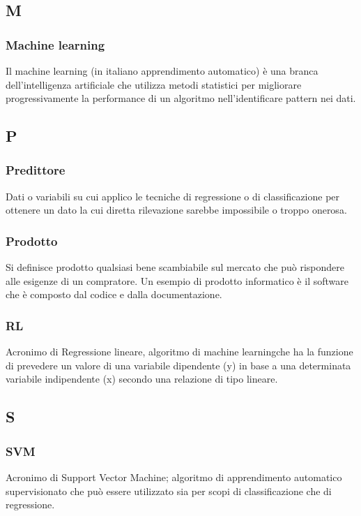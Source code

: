 
\subsection*{M}
\subsubsection*{Machine learning}
Il machine learning (in italiano apprendimento automatico) è una branca dell'intelligenza artificiale che utilizza metodi statistici per migliorare progressivamente la performance di un algoritmo nell'identificare pattern nei dati.

\subsection*{P}
\subsubsection*{Predittore}
Dati o variabili su cui applico le tecniche di regressione o di classificazione per ottenere un dato la cui diretta rilevazione sarebbe impossibile o troppo onerosa.

\subsubsection*{Prodotto}
Si definisce prodotto qualsiasi bene scambiabile sul mercato che può rispondere alle esigenze di un compratore. Un esempio di prodotto informatico è il software che è composto dal codice e dalla documentazione.	

\subsubsection*{RL}
Acronimo di Regressione lineare, algoritmo di machine learning\glosp che ha la funzione di prevedere un valore di una variabile dipendente (y) in base a una determinata variabile indipendente (x) secondo una relazione di tipo lineare.
\subsection*{S}
\subsubsection*{SVM}
Acronimo di Support Vector Machine; algoritmo di apprendimento automatico supervisionato che può essere utilizzato sia per scopi di classificazione che di regressione.

